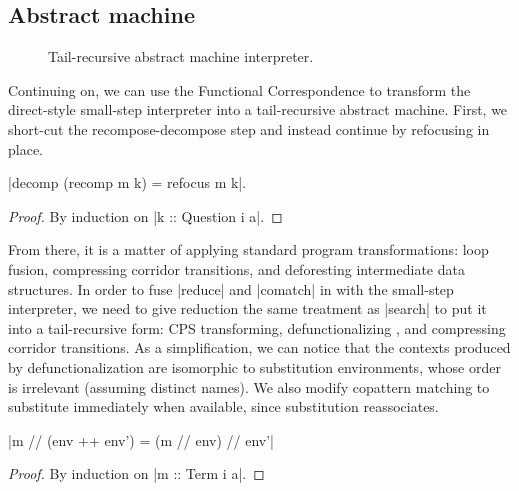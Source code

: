 \documentclass[sigplan,screen]{acmart}
\begin{document}
\subsection{Abstract machine}

\begin{figure}
\centering
{}
\caption{Tail-recursive abstract machine interpreter.}
\label{fig:block-machine-code}
\end{figure}

Continuing on, we can use the Functional Correspondence to transform the
direct-style small-step interpreter into a tail-recursive abstract machine.
First, we short-cut the recompose-decompose step and instead continue by
refocusing in place.
\begin{lemma}
  \label{thm:block-refocusing}

  \hs|decomp (recomp m k) = refocus m k|.
\end{lemma}
\begin{proof}
  By induction on \hs|k :: Question i a|.
\end{proof}
From there, it is a matter of applying standard program transformations: loop
fusion, compressing corridor transitions, and deforesting intermediate data
structures.  In order to fuse \hs|reduce| and \hs|comatch| in with the
small-step interpreter, we need to give reduction the same treatment as
\hs|search| to put it into a tail-recursive form: CPS transforming,
defunctionalizing \cite{DefinitionalInterpreters}, and compressing corridor
transitions.  As a simplification, we can notice that the contexts produced by
defunctionalization are isomorphic to substitution environments, whose order is
irrelevant (assuming distinct names).  We also modify copattern matching to
substitute immediately when available, since substitution reassociates.
\begin{lemma}
  \label{thm:block-subst-reassoc}
  \hs|m // (env ++ env') = (m // env) // env'|
\end{lemma}
\begin{proof}
  By induction on \hs|m :: Term i a|.
\end{proof}
\end{document}
